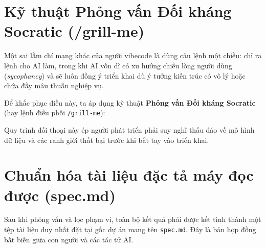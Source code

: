 \documentclass[a4paper,11pt]{article}
\begin{document}
\section{Kỹ thuật Phỏng vấn Đối kháng Socratic (/grill-me)}

Một sai lầm chí mạng khác của người vibecode là dùng câu lệnh một chiều: chỉ ra lệnh cho AI làm, trong khi AI vốn dĩ có xu hướng chiều lòng người dùng (\textit{sycophancy}) và sẽ luôn đồng ý triển khai dù ý tưởng kiến trúc có vô lý hoặc chứa đầy mâu thuẫn nghiệp vụ.

Để khắc phục điều này, ta áp dụng kỹ thuật \textbf{Phỏng vấn Đối kháng Socratic} (hay lệnh điều phối \texttt{/grill-me}):

\begin{center}
\end{center}

Quy trình đối thoại này ép người phát triển phải suy nghĩ thấu đáo về mô hình dữ liệu và các ranh giới thất bại trước khi bắt tay vào triển khai.

\section{Chuẩn hóa tài liệu đặc tả máy đọc được (spec.md)}

Sau khi phỏng vấn và lọc phạm vi, toàn bộ kết quả phải được kết tinh thành một tệp tài liệu duy nhất đặt tại gốc dự án mang tên \texttt{spec.md}. Đây là bản hợp đồng bất biến giữa con người và các tác tử AI.
\end{document}
